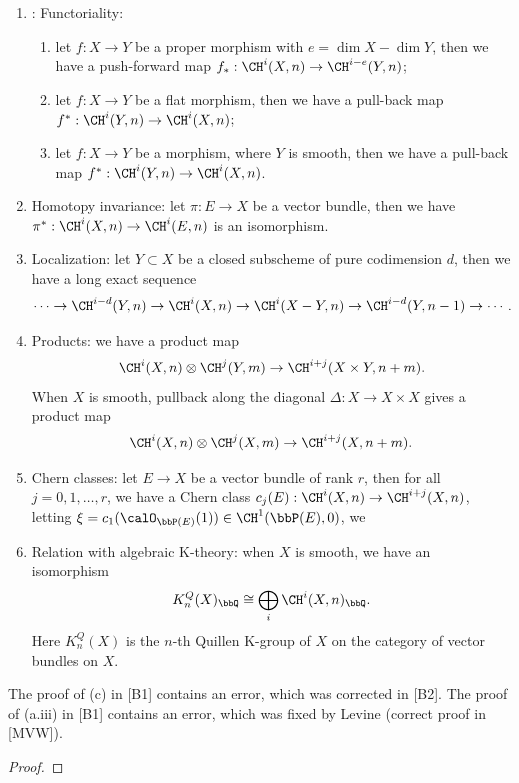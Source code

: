   \begin{proposition}
    \begin{enumerate}
      \item: Functoriality: 
        \begin{enumerate}
          \item let $f: X \to Y$ be a proper morphism with $e = \dim X - \dim Y$, then we have a push-forward map $f_*: \CH^i(X,n) \to \CH^{i-e}(Y,n)$;
          \item let $f: X \to Y$ be a flat morphism, then we have a pull-back map $f^*: \CH^i(Y,n) \to \CH^i(X,n)$;
          \item let $f: X \to Y$ be a morphism, where $Y$ is smooth, then we have a pull-back map $f^*: \CH^i(Y,n) \to \CH^i(X,n)$.
        \end{enumerate}
      \item Homotopy invariance: let $\pi: E \to X$ be a vector bundle, then we have $\pi^*: \CH^i(X,n) \to \CH^i(E,n)$ is an isomorphism.
      \item Localization: let $Y \subset X$ be a closed subscheme of pure codimension $d$, then we have a long exact sequence
        \[ \cdots \to \CH^{i-d}(Y,n) \to \CH^i(X,n) \to \CH^i(X-Y,n) \to \CH^{i-d}(Y,n-1) \to \cdots. \]
      \item Products: we have a product map
        \[ \CH^i(X,n) \otimes \CH^j(Y,m) \to \CH^{i+j}(X\times Y, n+m). \]
        When $X$ is smooth, pullback along the diagonal $\Delta: X \to X\times X$ gives a product map
        \[ \CH^i(X,n) \otimes \CH^j(X,m) \to \CH^{i+j}(X, n+m). \]
      \item Chern classes: let $E \to X$ be a vector bundle of rank $r$, then for all $j=0,1,\dots,r$, we have a Chern class $c_j(E): \CH^i(X,n) \to \CH^{i+j}(X,n)$, letting $\xi = c_1(\calO_{\bbP(E)}(1)) \in \CH^1(\bbP(E),0)$, we 
      \item Relation with algebraic K-theory: when $X$ is smooth, we have an isomorphism
        \[ K_n^Q(X)_\bbQ \cong \bigoplus_i \CH^i(X,n)_\bbQ. \]
        Here $K_n^Q(X)$ is the $n$-th Quillen K-group of $X$ on the category of vector bundles on $X$.
    \end{enumerate}
  \end{proposition}
  \begin{remark}
    The proof of (c) in [B1] contains an error, which was corrected in [B2].
    The proof of (a.iii) in [B1] contains an error, which was fixed by Levine (correct proof in [MVW]).
  \end{remark}
  \begin{proof}
    \Yang{}
  \end{proof}

